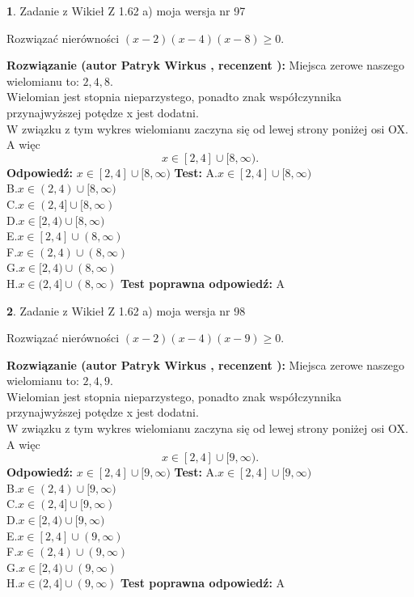 \documentclass[12pt, a4paper]{article}
\theoremstyle{definition} %
\newtheorem{zad}{}
\newcommand{\zadStart}[1]{\begin{zad}#1\newline}
\newcommand{\zadStop}{\end{zad}}
\newcommand{\rozwStart}[2]{\noindent \textbf{Rozwiązanie (autor #1 , recenzent #2): }\newline}
\newcommand{\rozwStop}{\newline}
\newcommand{\odpStart}{\noindent \textbf{Odpowiedź:}\newline}
\newcommand{\odpStop}{\newline}
\newcommand{\testStart}{\noindent \textbf{Test:}\newline}
\newcommand{\testStop}{\newline}
\newcommand{\kluczStart}{\noindent \textbf{Test poprawna odpowiedź:}\newline}
\newcommand{\kluczStop}{\newline}
\begin{document}
\zadStart{Zadanie z Wikieł Z 1.62 a) moja wersja nr 97}

Rozwiązać nierówności $(x-2)(x-4)(x-8)\ge0$.
\zadStop
\rozwStart{Patryk Wirkus}{}
Miejsca zerowe naszego wielomianu to: $2, 4, 8$.\\
Wielomian jest stopnia nieparzystego, ponadto znak współczynnika przy\linebreak najwyższej potędze x jest dodatni.\\ W związku z tym wykres wielomianu zaczyna się od lewej strony poniżej osi OX. A więc $$x \in [2,4] \cup [8,\infty).$$
\rozwStop
\odpStart
$x \in [2,4] \cup [8,\infty)$
\odpStop
\testStart
A.$x \in [2,4] \cup [8,\infty)$\\
B.$x \in (2,4) \cup [8,\infty)$\\
C.$x \in (2,4] \cup [8,\infty)$\\
D.$x \in [2,4) \cup [8,\infty)$\\
E.$x \in [2,4] \cup (8,\infty)$\\
F.$x \in (2,4) \cup (8,\infty)$\\
G.$x \in [2,4) \cup (8,\infty)$\\
H.$x \in (2,4] \cup (8,\infty)$
\testStop
\kluczStart
A
\kluczStop



\zadStart{Zadanie z Wikieł Z 1.62 a) moja wersja nr 98}

Rozwiązać nierówności $(x-2)(x-4)(x-9)\ge0$.
\zadStop
\rozwStart{Patryk Wirkus}{}
Miejsca zerowe naszego wielomianu to: $2, 4, 9$.\\
Wielomian jest stopnia nieparzystego, ponadto znak współczynnika przy\linebreak najwyższej potędze x jest dodatni.\\ W związku z tym wykres wielomianu zaczyna się od lewej strony poniżej osi OX. A więc $$x \in [2,4] \cup [9,\infty).$$
\rozwStop
\odpStart
$x \in [2,4] \cup [9,\infty)$
\odpStop
\testStart
A.$x \in [2,4] \cup [9,\infty)$\\
B.$x \in (2,4) \cup [9,\infty)$\\
C.$x \in (2,4] \cup [9,\infty)$\\
D.$x \in [2,4) \cup [9,\infty)$\\
E.$x \in [2,4] \cup (9,\infty)$\\
F.$x \in (2,4) \cup (9,\infty)$\\
G.$x \in [2,4) \cup (9,\infty)$\\
H.$x \in (2,4] \cup (9,\infty)$
\testStop
\kluczStart
A
\kluczStop
\end{document}
